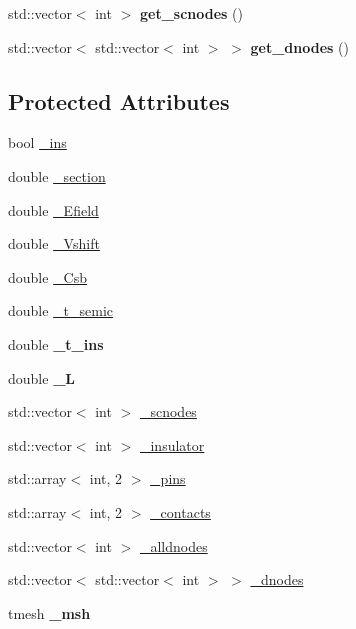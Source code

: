 \begin{DoxyCompactItemize}
\item 
\hypertarget{classDevice_ad94670d8bf4f429450fab8f84cc5c7cf}{std\-::vector$<$ int $>$ {\bfseries get\-\_\-scnodes} ()}\label{classDevice_ad94670d8bf4f429450fab8f84cc5c7cf}

\item 
\hypertarget{classDevice_ad6e6acb722ce98a93997dd700a4d5b98}{std\-::vector$<$ std\-::vector$<$ int $>$ $>$ {\bfseries get\-\_\-dnodes} ()}\label{classDevice_ad6e6acb722ce98a93997dd700a4d5b98}

\end{DoxyCompactItemize}
\subsection*{Protected Attributes}
\begin{DoxyCompactItemize}
\item 
bool \hyperlink{classDevice_a6a2533da6415d36d8c5f97f8562a4b4d}{\-\_\-ins}
\item 
double \hyperlink{classDevice_ae1288d49aa397c5889c8c9920598da11}{\-\_\-section}
\item 
double \hyperlink{classDevice_af793e2c95dbadc7e317cd63d4f689d74}{\-\_\-\-Efield}
\item 
double \hyperlink{classDevice_ac69abf458fa89193ff89961d2708ec7c}{\-\_\-\-Vshift}
\item 
double \hyperlink{classDevice_a1c4b801f7ac108dc211c1496fe3efd6a}{\-\_\-\-Csb}
\item 
double \hyperlink{classDevice_abee50855aea21bb07d1f3ea055821b06}{\-\_\-t\-\_\-semic}
\item 
\hypertarget{classDevice_aabc3920185aaa66f2097245d1f52da7c}{double {\bfseries \-\_\-t\-\_\-ins}}\label{classDevice_aabc3920185aaa66f2097245d1f52da7c}

\item 
\hypertarget{classDevice_ac869b1182e0962d678fa0e1fd34fc876}{double {\bfseries \-\_\-\-L}}\label{classDevice_ac869b1182e0962d678fa0e1fd34fc876}

\item 
std\-::vector$<$ int $>$ \hyperlink{classDevice_adb12865709040d74f442b1ac77978883}{\-\_\-scnodes}
\item 
std\-::vector$<$ int $>$ \hyperlink{classDevice_a442a52d6324ed44754d078924e66736b}{\-\_\-insulator}
\item 
std\-::array$<$ int, 2 $>$ \hyperlink{classDevice_a7217f5ba8adcda962f8936dda7bfb1c8}{\-\_\-pins}
\item 
std\-::array$<$ int, 2 $>$ \hyperlink{classDevice_acf7fe7f3a3e056ad1da9ae842b386401}{\-\_\-contacts}
\item 
std\-::vector$<$ int $>$ \hyperlink{classDevice_afcc8edfa468c7386432d3b075ad99f26}{\-\_\-alldnodes}
\item 
std\-::vector$<$ std\-::vector$<$ int $>$ $>$ \hyperlink{classDevice_a554d8519650b873bf40e4e5653ed346e}{\-\_\-dnodes}
\item 
\hypertarget{classDevice_a2293c99bae87d57e890749f40c6e8d34}{tmesh {\bfseries \-\_\-msh}}\label{classDevice_a2293c99bae87d57e890749f40c6e8d34}

\end{DoxyCompactItemize}


